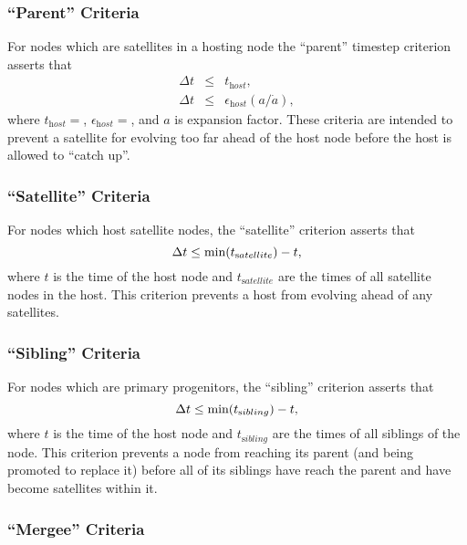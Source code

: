 \subsubsection{``Parent'' Criteria}

For \glspl{node} which are satellites in a hosting \gls{node} the ``\gls{parent}'' timestep criterion asserts that
\begin{eqnarray}
\Delta t &\le& t_{\mathrm host}, \\
\Delta t &\le& \epsilon_{\mathrm host} (a/\dot{a}),
\end{eqnarray}
where $t_{\mathrm host}=${\normalfont \ttfamily [timestepHostAbsolute]}, $\epsilon_{\mathrm host}=${\normalfont \ttfamily [timestepHostRelative]}, and $a$ is expansion factor. These criteria are intended to prevent a satellite for evolving too far ahead of the host node before the host is allowed to ``catch up''.

\subsubsection{``Satellite'' Criteria}

For \glspl{node} which host satellite \glspl{node}, the ``satellite'' criterion asserts that
\begin{equation}
 \Delta t \le \hbox{min}(t_{\mathrm satellite}) - t,
\end{equation}
where $t$ is the time of the host \gls{node} and $t_{\mathrm satellite}$ are the times of all satellite \glspl{node} in the host. This criterion prevents a host from evolving ahead of any satellites.

\subsubsection{``Sibling'' Criteria}

For \glspl{node} which are \glspl{primary progenitor}, the ``sibling'' criterion asserts that
\begin{equation}
 \Delta t \le \hbox{min}(t_{\mathrm sibling}) - t,
\end{equation}
where $t$ is the time of the host \gls{node} and $t_{\mathrm sibling}$ are the times of all siblings of the \gls{node}. This criterion prevents a \gls{node} from reaching its \gls{parent} (and being promoted to replace it) before all of its siblings have reach the \gls{parent} and have become satellites within it.

\subsubsection{``Mergee'' Criteria}

